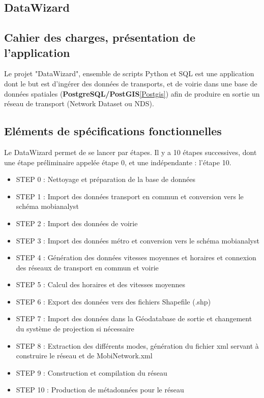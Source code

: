 \begin{itemize}
\pagebreak

\section{DataWizard}\label{DataWizard}

\subsection{Cahier des charges, présentation de l'application}

Le projet "DataWizard", ensemble de scripts Python et SQL est une application dont le but est d'ingérer des données de transports, et de voirie dans une base de données spatiales (\textbf{PostgreSQL/PostGIS}\ref{Postgis}) afin de produire en sortie un réseau de transport (Network Dataset ou NDS).\\


\subsection{Eléments de spécifications fonctionnelles}

Le DataWizard permet de se lancer par étapes. Il y a 10 étapes successives, dont une étape préliminaire appelée étape 0, et une indépendante : l'étape 10.
\begin{itemize}
\item STEP 0 : Nettoyage et préparation de la base de données
\item STEP 1 : Import des données transport en commun et conversion vers le schéma mobianalyst
\item STEP 2 : Import des données de voirie
\item STEP 3 : Import des données métro et conversion vers le schéma mobianalyst
\item STEP 4 : Génération des données vitesses moyennes et horaires et connexion des réseaux de transport en commun et voirie
\item STEP 5 : Calcul des horaires et des vitesses moyennes
\item STEP 6 : Export des données vers des fichiers Shapefile (.shp)
\item STEP 7 : Import des données dans la Géodatabase de sortie et changement du système de projection si nécessaire
\item STEP 8 : Extraction des différents modes, génération du fichier xml servant à construire le réseau et de MobiNetwork.xml
\item STEP 9 : Construction et compilation du réseau
\item STEP 10 : Production de métadonnées pour le réseau
\end{itemize}


\end{itemize}
